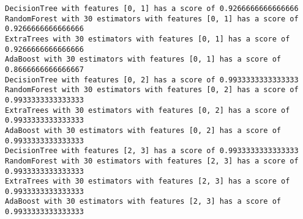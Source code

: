 \begin{Verbatim}[commandchars=\\\{\}]
DecisionTree with features [0, 1] has a score of 0.9266666666666666
RandomForest with 30 estimators with features [0, 1] has a score of
0.9266666666666666
ExtraTrees with 30 estimators with features [0, 1] has a score of
0.9266666666666666
AdaBoost with 30 estimators with features [0, 1] has a score of
0.8666666666666667
DecisionTree with features [0, 2] has a score of 0.9933333333333333
RandomForest with 30 estimators with features [0, 2] has a score of
0.9933333333333333
ExtraTrees with 30 estimators with features [0, 2] has a score of
0.9933333333333333
AdaBoost with 30 estimators with features [0, 2] has a score of
0.9933333333333333
DecisionTree with features [2, 3] has a score of 0.9933333333333333
RandomForest with 30 estimators with features [2, 3] has a score of
0.9933333333333333
ExtraTrees with 30 estimators with features [2, 3] has a score of
0.9933333333333333
AdaBoost with 30 estimators with features [2, 3] has a score of
0.9933333333333333
\end{Verbatim}